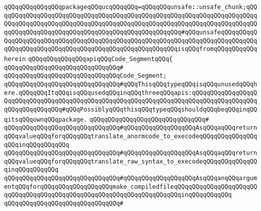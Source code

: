 \verb|qQQqqQQqqQQqqQQqpackageqQQqucqQQqqQQq=qQQqqQQqunsafe::unsafe_chunk;qQQqqQQqqQQqqQQqqQQqqQQqqQQqqQQqqQQqqQQqqQQqqQQqqQQqqQQqqQQqqQQqqQQqqQQqqQQqqQQqqQQqqQQqqQQqqQQqqQQqqQQqqQQqqQQqqQQqqQQqqQQqqQQqqQQqqQQqqQQqqQQqqQQqqQQqqQQqqQQqqQQqqQQqqQQqqQQqqQQqqQQqqQQqqQQq#qQQqunsafeqQQqqQQqqQQqqQQqqQQqqQQqqQQqqQQqqQQqqQQqqQQqqQQqqQQqqQQqqQQqqQQqqQQqqQQqqQQqqQQqqQQqqQQqqQQqqQQqqQQqqQQqqQQqqQQqqQQqqQQqqQQqqQQqisqQQqfromqQQqqQQqqQQq|\newline
\verb|herein|\newline
\newline
\verb|qQQqqQQqqQQqqQQqapiqQQqCode_SegmentqQQq{|\newline
\verb|qQQqqQQqqQQqqQQqqQQqqQQqqQQqqQQq#|\newline
\verb|qQQqqQQqqQQqqQQqqQQqqQQqqQQqqQQqCode_Segment;|\newline
\newline
\verb|qQQqqQQqqQQqqQQqqQQqqQQqqQQqqQQq#qQQqThisqQQqtypeqQQqisqQQqunusedqQQqhere.qQQqqQQqItqQQqisqQQqusedqQQqinqQQqthreeqQQqapis:qQQqqQQqqQQqqQQqqQQqqQQqqQQqqQQqqQQqqQQqqQQqqQQqqQQqqQQqqQQqqQQqqQQqqQQqqQQqqQQqqQQqqQQqqQQqqQQqqQQqqQQq#qQQqPossiblyqQQqthisqQQqtypeqQQqshouldqQQqbeqQQqinqQQqitsqQQqownqQQqpackage.|\newline
\verb|qQQqqQQqqQQqqQQqqQQqqQQqqQQqqQQq#|\newline
\verb|qQQqqQQqqQQqqQQqqQQqqQQqqQQqqQQq#qQQqqQQqqQQqqQQqqQQqAsqQQqaqQQqreturnqQQqvalueqQQqforqQQqqQQqtranslate_anormcode_to_execodeqQQqqQQqqQQqqQQqqQQqinqQQqqQQqqQQq|\newline
\verb|qQQqqQQqqQQqqQQqqQQqqQQqqQQqqQQq#qQQqqQQqqQQqqQQqqQQqAsqQQqaqQQqreturnqQQqvalueqQQqforqQQqqQQqtranslate_raw_syntax_to_execodeqQQqqQQqqQQqqQQqinqQQqqQQqqQQq|\newline
\verb|qQQqqQQqqQQqqQQqqQQqqQQqqQQqqQQq#qQQqqQQqqQQqqQQqqQQqAsqQQqanqQQqargumentqQQqforqQQqqQQqqQQqqQQqqQQqmake_compiledfileqQQqqQQqqQQqqQQqqQQqqQQqqQQqqQQqqQQqqQQqqQQqqQQqqQQqqQQqqQQqqQQqqQQqqQQqinqQQqqQQqqQQq|\newline
\verb|qQQqqQQqqQQqqQQqqQQqqQQqqQQqqQQq#|\newline
